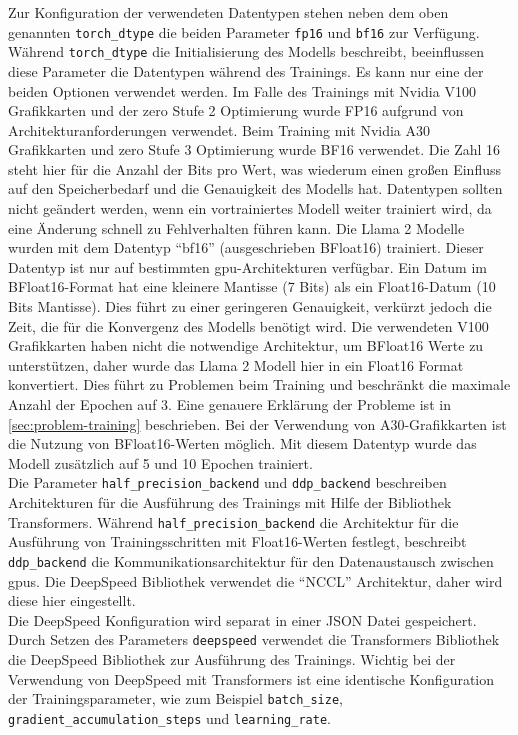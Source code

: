 Zur Konfiguration der verwendeten Datentypen stehen neben dem oben genannten \texttt{torch\_dtype} die beiden Parameter \texttt{fp16} und \texttt{bf16} zur Verfügung. Während \texttt{torch\_dtype} die Initialisierung des Modells beschreibt, beeinflussen diese Parameter die Datentypen während des Trainings.
Es kann nur eine der beiden Optionen verwendet werden. Im Falle des Trainings mit Nvidia V100 Grafikkarten und der \ac{zero} Stufe 2 Optimierung wurde FP16 aufgrund von Architekturanforderungen verwendet. Beim Training mit Nvidia A30 Grafikkarten und \ac{zero} Stufe 3 Optimierung wurde BF16 verwendet.
Die Zahl 16 steht hier für die Anzahl der Bits pro Wert, was wiederum einen großen Einfluss auf den Speicherbedarf und die Genauigkeit des Modells hat.
Datentypen sollten nicht geändert werden, wenn ein vortrainiertes Modell weiter trainiert wird, da eine Änderung schnell zu Fehlverhalten führen kann.
Die Llama 2 Modelle wurden mit dem Datentyp \enquote{bf16} (ausgeschrieben BFloat16) trainiert.
Dieser Datentyp ist nur auf bestimmten \ac{gpu}-Architekturen verfügbar.
Ein Datum im BFloat16-Format hat eine kleinere Mantisse (7 Bits) als ein Float16-Datum (10 Bits Mantisse). Dies führt zu einer geringeren Genauigkeit, verkürzt jedoch die Zeit, die für die Konvergenz des Modells benötigt wird.
Die verwendeten V100 Grafikkarten haben nicht die notwendige Architektur, um BFloat16 Werte zu unterstützen, daher wurde das Llama 2 Modell hier in ein Float16 Format konvertiert.
Dies führt zu Problemen beim Training und beschränkt die maximale Anzahl der Epochen auf 3. Eine genauere Erklärung der Probleme ist in \cref{sec:problem-training} beschrieben.
Bei der Verwendung von A30-Grafikkarten ist die Nutzung von BFloat16-Werten möglich. Mit diesem Datentyp wurde das Modell zusätzlich auf 5 und 10 Epochen trainiert.\\

Die Parameter \texttt{half\_precision\_backend} und \texttt{ddp\_backend} beschreiben Architekturen für die Ausführung des Trainings mit Hilfe der Bibliothek Transformers.
Während \texttt{half\_precision\_backend} die Architektur für die Ausführung von Trainingsschritten mit Float16-Werten festlegt, beschreibt \texttt{ddp\_backend} die Kommunikationsarchitektur für den Datenaustausch zwischen \ac{gpu}s.
Die DeepSpeed Bibliothek verwendet die \enquote{NCCL} Architektur, daher wird diese hier eingestellt.\\

Die DeepSpeed Konfiguration wird separat in einer JSON Datei gespeichert.
Durch Setzen des Parameters \texttt{deepspeed} verwendet die Transformers Bibliothek \citep{transformers} die DeepSpeed Bibliothek \citep{deepspeed} zur Ausführung des Trainings.
Wichtig bei der Verwendung von DeepSpeed mit Transformers ist eine identische Konfiguration der Trainingsparameter, wie zum Beispiel \texttt{batch\_size}, \texttt{gradient\_accumulation\_steps} und \texttt{learning\_rate}.\\

